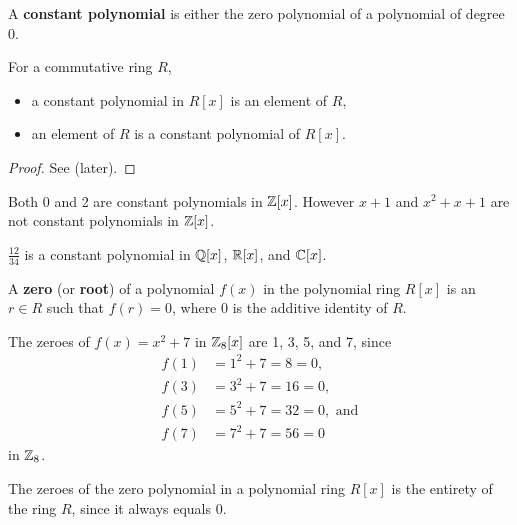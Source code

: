 \begin{definition}
    A \textbf{constant polynomial} is either the zero polynomial of a polynomial of degree 0.
\end{definition}
\begin{proposition}\label{prop-constant-polynomial-iff-ring-element}
    For a commutative ring $R$,
    \begin{itemize}
        \item a constant polynomial in $R[x]$ is an element of $R$,
        \item an element of $R$ is a constant polynomial of $R[x]$.
    \end{itemize}
\end{proposition}
\begin{proof}
    See  (later).
\end{proof}
\begin{example}
    Both 0 and 2 are constant polynomials in $\mathbb{Z}[x]$. However $x + 1$ and $x^2 + x + 1$ are not constant polynomials in $\mathbb{Z}[x]$.
\end{example}
\begin{example}
    $\frac{12}{34}$ is a constant polynomial in $\mathbb{Q}[x]$, $\mathbb{R}[x]$, and $\mathbb{C}[x]$.
\end{example}

\begin{definition}
    A \textbf{zero} (or \textbf{root}) of a polynomial $f(x)$ in the polynomial ring $R[x]$ is an $r \in R$ such that $f(r) = 0$, where 0 is the additive identity of $R$.
\end{definition}
\begin{example}
    The zeroes of $f(x) = x^2+7$ in $\mathbb{Z}_8[x]$ are 1, 3, 5, and 7, since
    \begin{align*}
        f(1) &= 1^2 + 7 = 8 = 0,\\
        f(3) &= 3^2 + 7 = 16 = 0,\\
        f(5) &= 5^2 + 7 = 32 = 0, \text{ and}\\
        f(7) &= 7^2 + 7 = 56 = 0
    \end{align*}
    in $\mathbb{Z}_8$.
\end{example}
\begin{example}
    The zeroes of the zero polynomial in a polynomial ring $R[x]$ is the entirety of the ring $R$, since it always equals 0.
\end{example}

